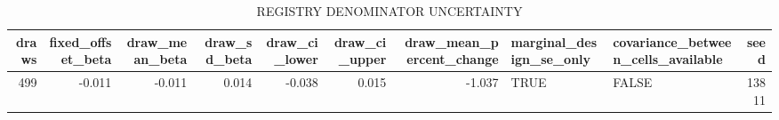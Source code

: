 \begin{table}[!htbp]
\centering
\begingroup\scriptsize
\begin{tabular}{rrrrrrrllr}
  \hline
draws & fixed\_offset\_beta & draw\_mean\_beta & draw\_sd\_beta & draw\_ci\_lower & draw\_ci\_upper & draw\_mean\_percent\_change & marginal\_design\_se\_only & covariance\_between\_cells\_available & seed \\ 
  \hline
 499 & -0.011 & -0.011 & 0.014 & -0.038 & 0.015 & -1.037 & TRUE & FALSE & 13811 \\ 
   \hline
\end{tabular}
\endgroup
\caption{REGISTRY DENOMINATOR UNCERTAINTY} 
\label{tab:registry_denominator_uncertainty}
\end{table}

